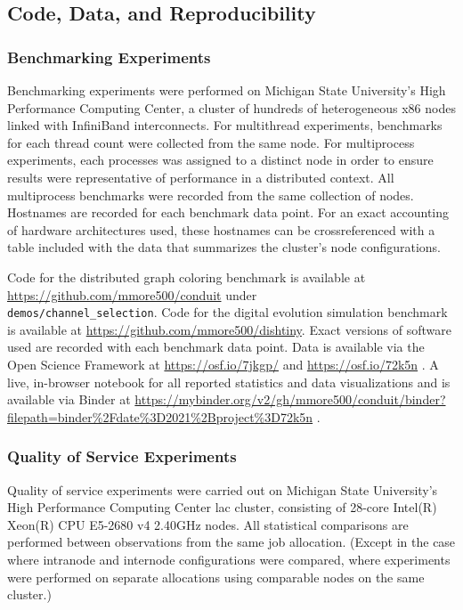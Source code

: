 \subsection{Code, Data, and Reproducibility}

\subsubsection{Benchmarking Experiments} \label{sec:methods-code-data-reproducibility-benchmarking-experiments}

Benchmarking experiments were performed on Michigan State University's High Performance Computing Center, a cluster of hundreds of heterogeneous x86 nodes linked with InfiniBand interconnects.
For multithread experiments, benchmarks for each thread count were collected from the same node.
For multiprocess experiments, each processes was assigned to a distinct node in order to ensure results were representative of performance in a distributed context.
All multiprocess benchmarks were recorded from the same collection of nodes.
Hostnames are recorded for each benchmark data point.
For an exact accounting of hardware architectures used, these hostnames can be crossreferenced with a table included with the data that summarizes the cluster's node configurations.

Code for the distributed graph coloring benchmark is available at \url{https://github.com/mmore500/conduit} under \\ \texttt{demos/channel\_selection}.
Code for the digital evolution simulation benchmark is available at \url{https://github.com/mmore500/dishtiny}.
Exact versions of software used are recorded with each benchmark data point.
Data is available via the Open Science Framework at \url{https://osf.io/7jkgp/} and \url{https://osf.io/72k5n} \citep{foster2017open}.
A live, in-browser notebook for all reported statistics and data visualizations and is available via Binder at \url{https://mybinder.org/v2/gh/mmore500/conduit/binder?filepath=binder%2Fdate%3D2021%2Bproject%3D72k5n} \citep{jupyter2018binder}.

\subsubsection{Quality of Service Experiments}

Quality of service experiments were carried out on Michigan State University's High Performance Computing Center lac cluster, consisting of 28-core Intel(R) Xeon(R) CPU E5-2680 v4 \@ 2.40GHz nodes.
All statistical comparisons are performed between observations from the same job allocation.
(Except in the case where intranode and internode configurations were compared, where experiments were performed on separate allocations using comparable nodes on the same cluster.)

